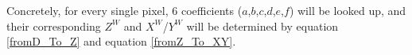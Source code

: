 \\\\%
Concretely, for every single pixel, 6 coefficients (\(a\),\(b\),\(c\),\(d\),\(e\),\(f\)) will be looked up, and their corresponding \(Z^{W}\) and \(X^{W}\)/\(Y^{W}\) will be determined by equation \ref{fromD_To_Z} and equation \ref{fromZ_To_XY}.
%
%
%
%
%
%
%
%
%































